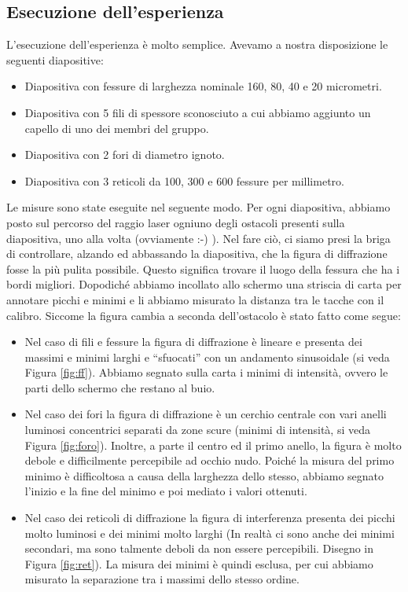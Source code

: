 \subsection{Esecuzione dell'esperienza}

L'esecuzione dell'esperienza è molto semplice. Avevamo a nostra disposizione le seguenti diapositive:

\begin{itemize}
    \item{Diapositiva con fessure di larghezza nominale 160, 80, 40 e 20 micrometri.}
    \item{Diapositiva con 5 fili di spessore sconosciuto a cui abbiamo aggiunto un capello di uno dei membri del gruppo.}
    \item{Diapositiva con 2 fori di diametro ignoto.}
    \item{Diapositiva con 3 reticoli da 100, 300 e 600 fessure per millimetro.}
\end{itemize}

Le misure sono state eseguite nel seguente modo. Per ogni diapositiva, abbiamo posto sul percorso del raggio laser ogniuno degli ostacoli
presenti sulla diapositiva, uno alla volta (ovviamente :-) ). Nel fare ciò, ci siamo presi la briga di controllare, alzando ed abbassando
la diapositiva, che la figura di diffrazione fosse la più pulita possibile. Questo significa trovare il luogo della fessura che ha i bordi
migliori. Dopodiché abbiamo incollato allo schermo una striscia di carta per annotare picchi e minimi e li abbiamo misurato la distanza tra
le tacche con il calibro. Siccome la figura cambia a seconda dell'ostacolo è stato fatto come segue:

\begin{itemize}
    \item{Nel caso di fili e fessure la figura di diffrazione è lineare e presenta dei massimi e minimi larghi e ``sfuocati'' con un andamento
        sinusoidale (si veda Figura \ref{fig:ff}). Abbiamo segnato sulla carta i minimi di intensità, ovvero le parti dello schermo
        che restano al buio.}
    \item{Nel caso dei fori la figura di diffrazione è un cerchio centrale con vari anelli luminosi concentrici separati da
        zone scure (minimi di intensità, si veda Figura \ref{fig:foro}). Inoltre, a parte il centro ed il primo anello,
        la figura è molto debole e difficilmente
        percepibile ad occhio nudo. Poiché la misura del primo minimo è difficoltosa a causa della larghezza dello stesso, abbiamo segnato
        l'inizio e la fine del minimo e poi mediato i valori ottenuti.}
    \item{Nel caso dei reticoli di diffrazione la figura di interferenza presenta dei picchi molto luminosi e dei minimi molto larghi
            (In realtà ci sono anche dei minimi secondari, ma sono talmente deboli da non essere percepibili. Disegno in Figura \ref{fig:ret}).
            La misura dei minimi è quindi esclusa, per cui abbiamo misurato la separazione tra i massimi dello stesso ordine.}
\end{itemize}

